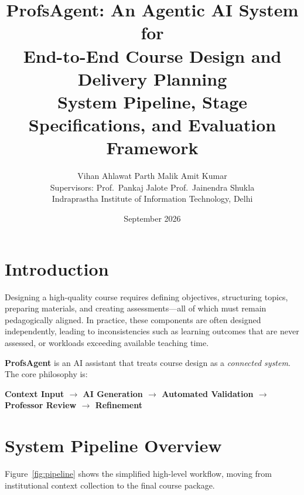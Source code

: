 \documentclass[11pt,a4paper]{article}
\title{
\vspace{-1cm}
\textbf{ProfsAgent: An Agentic AI System for\\End-to-End Course Design and Delivery Planning}\\[0.3cm]
\large System Pipeline, Stage Specifications, and Evaluation Framework
}
\author{Vihan Ahlawat \quad Parth Malik \quad Amit Kumar\\[0.1cm]
\small Supervisors: Prof.\ Pankaj Jalote \quad Prof.\ Jainendra Shukla\\
\small Indraprastha Institute of Information Technology, Delhi}
\date{September 2026}
\begin{document}
\maketitle
\thispagestyle{fancy}

\section{Introduction}

Designing a high-quality course requires defining objectives, structuring topics, preparing materials, and creating assessments---all of which must remain pedagogically aligned. In practice, these components are often designed independently, leading to inconsistencies such as learning outcomes that are never assessed, or workloads exceeding available teaching time.

\textbf{ProfsAgent} is an AI assistant that treats course design as a \textit{connected system}. The core philosophy is:
\begin{center}
\textbf{Context Input $\to$ AI Generation $\to$ Automated Validation $\to$ Professor Review $\to$ Refinement}
\end{center}

\section{System Pipeline Overview}

Figure~\ref{fig:pipeline} shows the simplified high-level workflow, moving from institutional context collection to the final course package.
\end{document}

